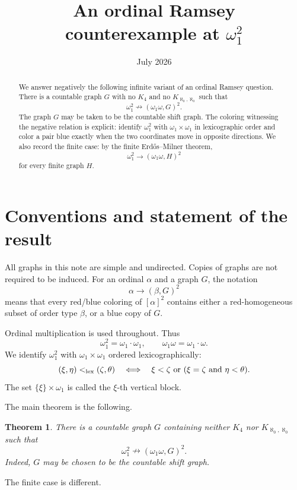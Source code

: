 \documentclass[11pt,a4paper]{amsart}
\title[An ordinal Ramsey counterexample]{An ordinal Ramsey counterexample at $\omega_1^2$}
\author{}
\date{July 2026}
\newtheorem{theorem}{Theorem}[section]
\theoremstyle{definition}
\begin{document}
\begin{abstract}
We answer negatively the following infinite variant of an ordinal Ramsey question.  There is a countable graph $G$ with no $K_4$ and no $K_{\aleph_0,\aleph_0}$ such that
\[
        \omega_1^2 \nrightarrow (\omega_1\omega,G)^2.
\]
The graph $G$ may be taken to be the countable shift graph.  The coloring witnessing the negative relation is explicit: identify $\omega_1^2$ with $\omega_1\times\omega_1$ in lexicographic order and color a pair blue exactly when the two coordinates move in opposite directions.  We also record the finite case: by the finite Erd\H{o}s--Milner theorem,
\[
        \omega_1^2 \to (\omega_1\omega,H)^2
\]
for every finite graph $H$.
\end{abstract}
\maketitle

\section{Conventions and statement of the result}

All graphs in this note are simple and undirected.  Copies of graphs are not required to be induced.  For an ordinal $\alpha$ and a graph $G$, the notation
\[
        \alpha\to(\beta,G)^2
\]
means that every red/blue coloring of $[\alpha]^2$ contains either a red-homogeneous subset of order type $\beta$, or a blue copy of $G$.

Ordinal multiplication is used throughout.  Thus
\[
        \omega_1^2=\omega_1\cdot\omega_1,
        \qquad
        \omega_1\omega=\omega_1\cdot\omega.
\]
We identify $\omega_1^2$ with $\omega_1\times\omega_1$ ordered lexicographically:
\[
        (\xi,\eta)<_{\rm lex}(\zeta,\theta)
        \quad\Longleftrightarrow\quad
        \xi<\zeta\text{ or }(\xi=\zeta\text{ and }\eta<\theta).
\]
The set $\{\xi\}\times\omega_1$ is called the $\xi$-th vertical block.

The main theorem is the following.

\begin{theorem}\label{thm:main-negative}
There is a countable graph $G$ containing neither $K_4$ nor $K_{\aleph_0,\aleph_0}$ such that
\[
        \omega_1^2\nrightarrow(\omega_1\omega,G)^2.
\]
Indeed, $G$ may be chosen to be the countable shift graph.
\end{theorem}

The finite case is different.
\end{document}
